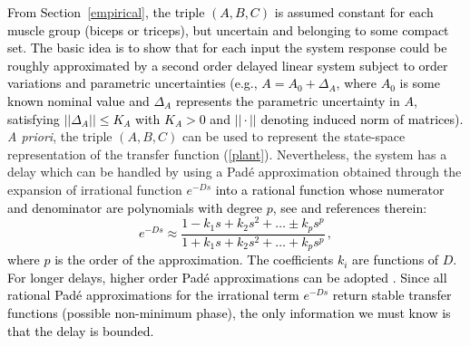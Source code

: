 \documentclass[review]{elsarticle}
\begin{document}
\textcolor{black}{From Section~\ref{empirical}, the triple $(A, B, C)$ is assumed constant for each muscle group (biceps or triceps), but uncertain and belonging to some compact set. The basic idea is to show that for each input the system response could be roughly approximated by a second order delayed linear system subject to order variations and parametric uncertainties
(e.g., $A=A_0 + \Delta_A$, where $A_0$ is some known nominal value and $\Delta_A$ represents the parametric uncertainty in $A$, satisfying
$||\Delta_A||\leq K_A$ with $K_A>0$ and $||\cdot||$ denoting induced norm of matrices).}
%
\emph{A priori}, the triple $(A,B,C)$ can be used to represent the state-space representation
of the transfer function (\ref{plant}). Nevertheless, the system has a delay which can be handled by using a Pad\'{e} approximation obtained through the expansion of irrational function $e^{-D s}$ \textcolor{black}{into a rational function whose numerator and denominator are polynomials with degree $p$, %
see \cite{L:1990} and references therein: 
%
\begin{equation*}
e^{-D s}\approx \frac{1 - k_1 s + k_2 s^2 + \ldots \pm k_p s^p}{1 + k_1 s + k_2 s^2 + \ldots + k_p s^p}\,,
\end{equation*}
%
\textcolor{black}{where $p$ is the order of the approximation. The coefficients $k_i$ are functions of $D$.} 
%
For longer delays, higher order Pad\'{e} approximations can be adopted \cite{L:1990}. Since all rational Pad\'e approximations for the irrational term $e^{-Ds}$ return stable transfer functions
(possible non-minimum phase), the only information we must know is that the delay is bounded. }
\end{document}
